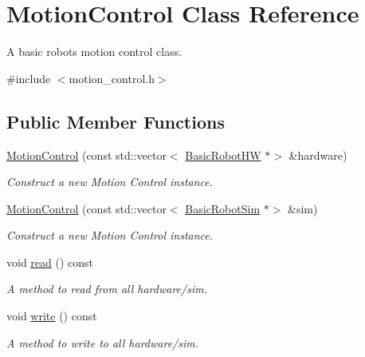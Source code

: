 \hypertarget{classMotionControl}{}\section{Motion\+Control Class Reference}
\label{classMotionControl}


A basic robot\textquotesingle{}s motion control class.  




{\ttfamily \#include $<$motion\+\_\+control.\+h$>$}

\subsection*{Public Member Functions}
\begin{DoxyCompactItemize}
\item 
\hyperlink{classMotionControl_ae8bab933ae11e44d888de44d76b246b3}{Motion\+Control} (const std\+::vector$<$ \hyperlink{classBasicRobotHW}{Basic\+Robot\+HW} $\ast$$>$ \&hardware)
\begin{DoxyCompactList}\small\item\em Construct a new Motion Control instance. \end{DoxyCompactList}\item 
\hyperlink{classMotionControl_ae3e70e9d88085d3b0dd023fd29b62613}{Motion\+Control} (const std\+::vector$<$ \hyperlink{classBasicRobotSim}{Basic\+Robot\+Sim} $\ast$$>$ \&sim)
\begin{DoxyCompactList}\small\item\em Construct a new Motion Control instance. \end{DoxyCompactList}\item 
\mbox{\label{classMotionControl_a2ab1c995c598f574387e84314c2af682}} 
void \hyperlink{classMotionControl_a2ab1c995c598f574387e84314c2af682}{read} () const
\begin{DoxyCompactList}\small\item\em A method to read from all hardware/sim. \end{DoxyCompactList}\item 
\mbox{\label{classMotionControl_a1f0a8b1c9f5a80831823dbb9f8dea708}} 
void \hyperlink{classMotionControl_a1f0a8b1c9f5a80831823dbb9f8dea708}{write} () const
\begin{DoxyCompactList}\small\item\em A method to write to all hardware/sim. \end{DoxyCompactList}\item 

\end{DoxyCompactItemize}
